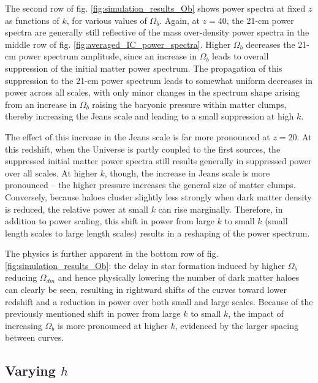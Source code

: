 \documentclass[floats,floatfix,showpacs,amssymb,prd,superscriptaddress,nofootinbib]{revtex4-2} %
\begin{document}

The second row of fig. \ref{fig:simulation_results_Ob} shows power spectra at fixed $z$ as functions of $k$, for various values of $\Omega_b$. Again, at $z = 40$, the 21-cm power spectra are generally still reflective of the mass over-density power spectra in the middle row of fig. \ref{fig:averaged_IC_power_spectra}. Higher $\Omega_b$ decreases the 21-cm power spectrum amplitude, since an increase in $\Omega_b$ leads to overall suppression of the initial matter power spectrum.  The propagation of this suppression to the 21-cm power spectrum leads to somewhat uniform decreases in power across all scales, with only minor changes in the spectrum shape arising from an increase in $\Omega_b$ raising the baryonic pressure within matter clumps, thereby increasing the Jeans scale and leading to a small suppression at high $k$. 

The effect of this increase in the Jeans scale is far more pronounced at $z = 20$. At this redshift, when the Universe is partly coupled to the first sources, the suppressed initial matter power spectra still results generally in suppressed power over all scales. At higher $k$, though, the increase in Jeans scale is more pronounced -- the higher pressure increases the general size of matter clumps. Conversely, because haloes cluster slightly less strongly when dark matter density is reduced, the relative power at small $k$ can rise marginally. Therefore, in addition to power scaling, this shift in power from large $k$ to small $k$ (small length scales to large length scales) results in a reshaping of the power spectrum.

The physics is further apparent in the bottom row of fig. \ref{fig:simulation_results_Ob}: the delay in star formation induced by higher $\Omega_b$ reducing $\Omega_{dm}$ and hence physically lowering the number of dark matter haloes can clearly be seen, resulting in rightward shifts of the curves toward lower redshift and a reduction in power over both small and large scales. Because of the previously mentioned shift in power from large $k$ to small $k$, the impact of increasing $\Omega_b$ is more pronounced at higher $k$, evidenced by the larger spacing between curves.



\subsection{Varying $h$}
\end{document}
